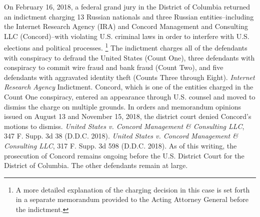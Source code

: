 On February 16, 2018, a federal grand jury in the District of Columbia returned an indictment charging 13 Russian nationals and three Russian entities--including the Internet Research Agency (IRA) and Concord Management and Consulting LLC (Concord)--with violating U.S. criminal laws in order to interfere with U.S. elections and political processes.%
\footnote{A more detailed explanation of the charging decision in this case is set forth in a separate memorandum provided to the Acting Attorney General before the indictment.}
The indictment charges all of the defendants with conspiracy to defraud the United States (Count One), three defendants with conspiracy to commit wire fraud and bank fraud (Count Two), and five defendants with aggravated identity theft (Counts Three through Eight).
\textit{Internet Research Agency} Indictment.
Concord, which is one of the entities charged in the Count One conspiracy, entered an appearance through U.S. counsel and moved to dismiss the charge on multiple grounds.
In orders and memorandum opinions issued on August 13 and November 15, 2018, the district court denied Concord's motions to dismiss.
\textit{United States v. Concord Management \& Consulting LLC}, 347 F. Supp. 3d 38 (D.D.C. 2018).
\textit{United States v. Concord Management \& Consulting LLC}, 317 F. Supp. 3d 598 (D.D.C. 2018).
As of this writing, the prosecution of Concord remains ongoing before the U.S. District Court for the District of Columbia.
The other defendants remain at large.

